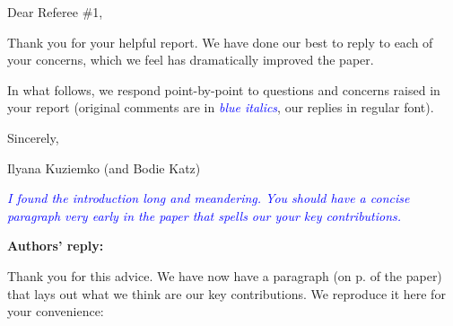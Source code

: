 \documentclass[12pt]{article}
\begin{document}
\begin{refsection}

\lhead{}


\renewcommand\thefigure{R1.\arabic{figure}}   
\renewcommand\thetable{R1.\arabic{figure}}   


\noindent Dear Referee \#1,

Thank you for your helpful report.  We have done our best to reply to each of your concerns, which we feel has dramatically improved the paper.





In what follows, we respond point-by-point to questions and concerns raised in your report (original comments are in \textcolor{blue}{\textit{blue italics}}, our replies in regular font).

\medskip \noindent
Sincerely,

\medskip \noindent
Ilyana Kuziemko (and Bodie Katz)

\newpage \clearpage

\textcolor{blue}{\textit{I found the introduction long and meandering.  You should have a concise paragraph very early in the paper that spells our your key contributions.}}

\medskip

\vspace{.5cm}
\textbf{Authors' reply:} 

\medskip

Thank you for this advice.  We have now have a paragraph (on p. \pageref{intro-page} of the paper) that lays out what we think are our key contributions.  We reproduce it here for your convenience:

\begin{quote}
\end{quote}


\printbibliography
\end{refsection}

\newpage \clearpage

\end{document}
